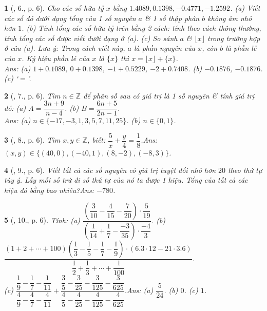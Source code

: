\documentclass{article}
\newtheorem{baitoan}{}
\begin{document}
\begin{baitoan}[\cite{Binh_Toan_7_tap_1}, 6., p. 6]
	Cho các số hữu tỷ $x$ bằng $1.4089, 0.1398, -0.4771, -1.2592$. (a) Viết các số đó dưới dạng tổng của 1 số nguyên $a$ \& 1 số thập phân $b$ không âm nhỏ hơn $1$. (b) Tính tổng các số hữu tỷ trên bằng 2 cách: tính theo cách thông thường, tính tổng các số được viết dưới dạng ở (a). (c) So sánh $a$ \& $\lfloor x\rfloor$ trong trường hợp ở câu (a). Lưu ý: Trong cách viết này, $a$ là \emph{phần nguyên} của $x$, còn $b$ là \emph{phần lẻ} của $x$. Ký hiệu phần lẻ của $x$ là $\{x\}$ thì $x = \lfloor x\rfloor + \{x\}$.\\\mbox{}\hfill{\sf Ans: (a) $1 + 0.1089$, $0 + 0.1398$, $-1 + 0.5229$, $-2 + 0.7408$. (b) $-0.1876$, $-0.1876$. (c) `$=$'.}
\end{baitoan}

\begin{baitoan}[\cite{Binh_Toan_7_tap_1}, 7., p. 6]
	Tìm $n\in\mathbb{Z}$ để phân số sau có giá trị là 1 số nguyên \& tính giá trị đó: (a) $A = \dfrac{3n + 9}{n - 4}$. (b) $B = \dfrac{6n + 5}{2n - 1}$.\\\mbox{}\hfill{\sf Ans: (a) $n\in\{-17,-3,1,3,5,7,11,25\}$. (b) $n\in\{0,1\}$.}
\end{baitoan}

\begin{baitoan}[\cite{Binh_Toan_7_tap_1}, 8., p. 6]
	Tìm $x,y\in\mathbb{Z}$, biết: $\dfrac{5}{x} + \dfrac{y}{4} = \dfrac{1}{8}$.\hfill{\sf Ans: $(x,y)\in\{(40,0),(-40,1),(8,-2),(-8,3)\}$.}
\end{baitoan}

\begin{baitoan}[\cite{Binh_Toan_7_tap_1}, 9., p. 6]
	Viết tất cả các số nguyên có giá trị tuyệt đối nhỏ hơn $20$ theo thứ tự tùy ý. Lấy mỗi số trừ đi số thứ tự của nó ta được 1 hiệu. Tổng của tất cả các hiệu đó bằng bao nhiêu?\hfill{\sf Ans: $-780$.}
\end{baitoan}

\begin{baitoan}[\cite{Binh_Toan_7_tap_1}, 10., p. 6]
	Tính: (a) $\dfrac{\left(\dfrac{3}{10} - \dfrac{4}{15} - \dfrac{7}{20}\right)\cdot\dfrac{5}{19}}{\left(\dfrac{1}{14} + \dfrac{1}{7} - \dfrac{-3}{35}\right)\cdot\dfrac{-4}{3}}$. (b) $\dfrac{(1 + 2 + \cdots + 100)\left(\dfrac{1}{3} - \dfrac{1}{5} - \dfrac{1}{7} - \dfrac{1}{9}\right)\cdot(6.3\cdot 12 - 21\cdot 3.6)}{\dfrac{1}{2} + \dfrac{1}{3} + \cdots + \dfrac{1}{100}}$.\\(c) $\dfrac{\dfrac{1}{9} - \dfrac{1}{7} - \dfrac{1}{11}}{\dfrac{4}{9} - \dfrac{4}{7} - \dfrac{4}{11}} + \dfrac{\dfrac{3}{5} - \dfrac{3}{25} - \dfrac{3}{125} - \dfrac{3}{625}}{\dfrac{4}{5} - \dfrac{4}{25} - \dfrac{4}{125} - \dfrac{4}{625}}$.\hfill{\sf Ans: (a) $\dfrac{5}{24}$. (b) $0$. (c) $1$.}
\end{baitoan}
\end{document}

